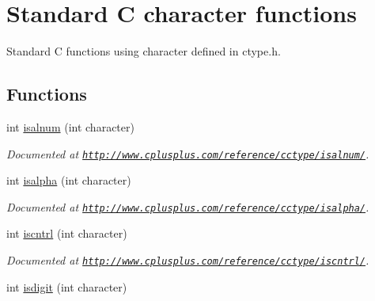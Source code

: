\hypertarget{group__char}{\section{Standard C character functions}
\label{group__char}
}


Standard C functions using character defined in ctype.\-h.  


\subsection*{Functions}
\begin{DoxyCompactItemize}
\item 
\hypertarget{group__char_gabe92a0aebef4717d08c64655ac44c9af}{int \hyperlink{group__char_gabe92a0aebef4717d08c64655ac44c9af}{isalnum} (int character)}\label{group__char_gabe92a0aebef4717d08c64655ac44c9af}

\begin{DoxyCompactList}\small\item\em Documented at \href{http://www.cplusplus.com/reference/cctype/isalnum/}{\tt http\-://www.\-cplusplus.\-com/reference/cctype/isalnum/}. \end{DoxyCompactList}\item 
\hypertarget{group__char_gaf947cbf1ae303e5297c9d68c68a6b9cb}{int \hyperlink{group__char_gaf947cbf1ae303e5297c9d68c68a6b9cb}{isalpha} (int character)}\label{group__char_gaf947cbf1ae303e5297c9d68c68a6b9cb}

\begin{DoxyCompactList}\small\item\em Documented at \href{http://www.cplusplus.com/reference/cctype/isalpha/}{\tt http\-://www.\-cplusplus.\-com/reference/cctype/isalpha/}. \end{DoxyCompactList}\item 
\hypertarget{group__char_gafdc5670ea66750c628cba1a0ce50f1d7}{int \hyperlink{group__char_gafdc5670ea66750c628cba1a0ce50f1d7}{iscntrl} (int character)}\label{group__char_gafdc5670ea66750c628cba1a0ce50f1d7}

\begin{DoxyCompactList}\small\item\em Documented at \href{http://www.cplusplus.com/reference/cctype/iscntrl/}{\tt http\-://www.\-cplusplus.\-com/reference/cctype/iscntrl/}. \end{DoxyCompactList}\item 
\hypertarget{group__char_ga2bba38ef78f7131817546eaab9b5a416}{int \hyperlink{group__char_ga2bba38ef78f7131817546eaab9b5a416}{isdigit} (int character)}\label{group__char_ga2bba38ef78f7131817546eaab9b5a416}


\end{DoxyCompactItemize}
